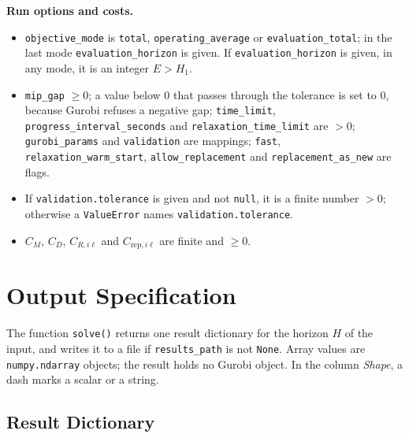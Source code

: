\textbf{Run options and costs.}
\begin{itemize}[leftmargin=1.5em]
  \item \texttt{objective\_mode} is \texttt{total}, \texttt{operating\_average} or \texttt{evaluation\_total}; in the last mode \texttt{evaluation\_horizon} is given. If \texttt{evaluation\_horizon} is given, in any mode, it is an integer $E > H_1$.
  \item \texttt{mip\_gap} $\ge 0$; a value below $0$ that passes through the tolerance is set to $0$, because Gurobi refuses a negative gap; \texttt{time\_limit}, \texttt{progress\_interval\_seconds} and \texttt{relaxation\_time\_limit} are $> 0$; \texttt{gurobi\_params} and \texttt{validation} are mappings; \texttt{fast}, \texttt{relaxation\_warm\_start}, \texttt{allow\_replacement} and \texttt{replacement\_as\_new} are flags.
  \item If \texttt{validation.tolerance} is given and not \texttt{null}, it is a finite number $> 0$; otherwise a \texttt{ValueError} names \texttt{validation.tolerance}.
  \item $C_M$, $C_D$, $C_{R,i\ell}$ and $C_{\mathrm{rep},i\ell}$ are finite and $\ge 0$.
\end{itemize}


\section{Output Specification}\label{sec:output}

The function \texttt{solve()} returns one result dictionary for the horizon $H$ of the input, and writes it to a file if \texttt{results\_path} is not \texttt{None}. Array values are \texttt{numpy.ndarray} objects; the result holds no Gurobi object.
In the column \emph{Shape}, a dash marks a scalar or a string.

\subsection{Result Dictionary}

